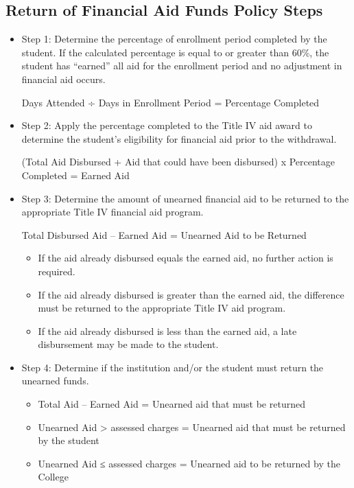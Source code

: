 \documentclass[
  letterpaper,
]{scrbook}
\providecommand{\tightlist}{%
  \setlength{\itemsep}{0pt}\setlength{\parskip}{0pt}}
\begin{document}
\subsection{Return of Financial Aid Funds Policy
Steps}\label{return-of-financial-aid-funds-policy-steps}

\begin{itemize}
\item
  Step 1: Determine the percentage of enrollment period completed by the
  student. If the calculated percentage is equal to or greater than
  60\%, the student has ``earned'' all aid for the enrollment period and
  no adjustment in financial aid occurs.

  Days Attended ÷ Days in Enrollment Period = Percentage Completed
\item
  Step 2: Apply the percentage completed to the Title IV aid award to
  determine the student's eligibility for financial aid prior to the
  withdrawal.

  (Total Aid Disbursed + Aid that could have been disbursed) x
  Percentage Completed = Earned Aid
\item
  Step 3: Determine the amount of unearned financial aid to be returned
  to the appropriate Title IV financial aid program.

  Total Disbursed Aid -- Earned Aid = Unearned Aid to be Returned

  \begin{itemize}
  \tightlist
  \item
    If the aid already disbursed equals the earned aid, no further
    action is required.
  \item
    If the aid already disbursed is greater than the earned aid, the
    difference must be returned to the appropriate Title IV aid program.
  \item
    If the aid already disbursed is less than the earned aid, a late
    disbursement may be made to the student.
  \end{itemize}
\item
  Step 4: Determine if the institution and/or the student must return
  the unearned funds.

  \begin{itemize}
  \tightlist
  \item
    Total Aid -- Earned Aid = Unearned aid that must be returned
  \item
    Unearned Aid \textgreater{} assessed charges = Unearned aid that
    must be returned by the student
  \item
    Unearned Aid ≤ assessed charges = Unearned aid to be returned by the
    College
  \end{itemize}
\end{itemize}
\end{document}
